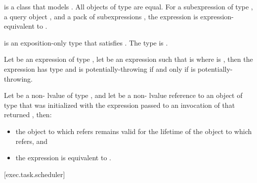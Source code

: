 \pnum
{} is a class that models
.
All objects of type  are equal.
For a subexpression  of type ,
a query object , and
a pack of subexpressions ,
the expression  is expression-equivalent to
.

\pnum
{} is an exposition-only type that satisfies
.
The type 
is .

\pnum
Let  be an expression of type ,
let  be an expression such that
 is 
where  is ,
then the expression  has
type 
and is potentially-throwing if and only if
 is potentially-throwing.

\pnum
Let  be a non- lvalue of type
, and let  be
a non- lvalue reference to an object of type  that
was initialized with the expression  passed to an
invocation of  that returned , then:
\begin{itemize}
\item the object to which  refers remains valid for
the lifetime of the object to which  refers, and
\item the expression  is equivalent to
.
\end{itemize}

[exec.task.scheduler]{}

